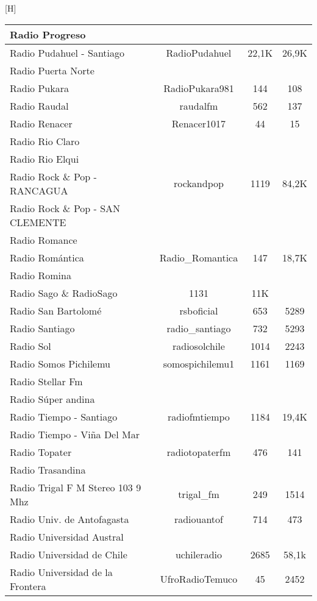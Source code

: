 \begin{center}[H]
\begin{longtable}{| l | c | c | c |}
Radio Progreso	&		&		&		\\ \hline
Radio Pudahuel - Santiago	&	RadioPudahuel	&	22,1K	&	26,9K	\\ \hline
Radio Puerta Norte	&		&		&		\\ \hline
Radio Pukara	&	RadioPukara981	&	144	&	108	\\ \hline
Radio Raudal	&	raudalfm	&	562	&	137	\\ \hline
Radio Renacer	&	Renacer1017	&	44	&	15	\\ \hline
Radio Rio Claro	&		&		&		\\ \hline
Radio Rio Elqui	&		&		&		\\ \hline
Radio Rock \& Pop - RANCAGUA	&	rockandpop	&	1119	&	84,2K	\\ \hline
Radio Rock \& Pop - SAN CLEMENTE	&		&		&		\\ \hline
Radio Romance	&		&		&		\\ \hline
Radio Romántica	&	Radio\_Romantica	&	147	&	18,7K	\\ \hline
Radio Romina	&		&		&		\\ \hline
Radio Sago	\&	RadioSago	&	1131	&	11K	\\ \hline
Radio San Bartolomé	&	rsboficial	&	653	&	5289	\\ \hline
Radio Santiago	&	radio\_santiago	&	732	&	5293	\\ \hline
Radio Sol	&	radiosolchile	&	1014	&	2243	\\ \hline
Radio Somos Pichilemu	&	somospichilemu1	&	1161	&	1169	\\ \hline
Radio Stellar Fm	&		&		&		\\ \hline
Radio Súper andina	&		&		&		\\ \hline
Radio Tiempo - Santiago	&	radiofmtiempo	&	1184	&	19,4K	\\ \hline
Radio Tiempo - Viña Del Mar	&		&		&		\\ \hline
Radio Topater	&	radiotopaterfm	&	476	&	141	\\ \hline
Radio Trasandina	&		&		&		\\ \hline
Radio Trigal F M Stereo 103 9 Mhz	&	trigal\_fm	&	249	&	1514	\\ \hline
Radio Univ. de Antofagasta	&	radiouantof	&	714	&	473	\\ \hline
Radio Universidad Austral	&		&		&		\\ \hline
Radio Universidad de Chile	&	uchileradio	&	2685	&	58,1k	\\ \hline
Radio Universidad de la Frontera	&	UfroRadioTemuco	&	45	&	2452	\\ \hline

\end{longtable}
\end{center}
